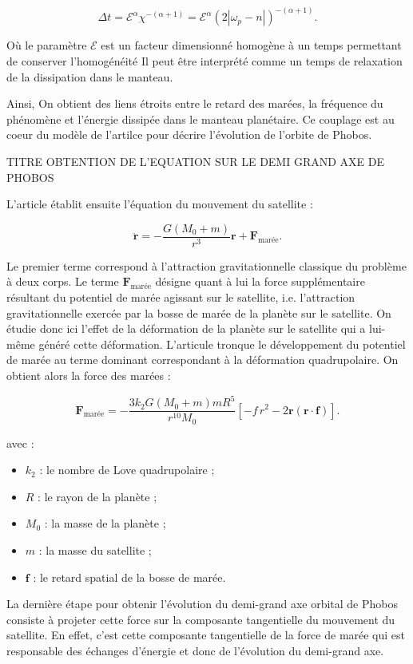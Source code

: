 \documentclass[12pt,a4paper]{article}
\begin{document}
\[
\Delta t = \mathcal{E}^\alpha \chi^{-(\alpha+1)}
=
\mathcal{E}^\alpha \left(2|\omega_p-n|\right)^{-(\alpha+1)}.
\]

Où le paramètre $\mathcal{E}$ est un facteur dimensionné homogène à un temps permettant de conserver l'homogénéité Il peut être interprété comme un temps de relaxation de la dissipation dans le manteau. 

Ainsi, On obtient des liens étroits entre le retard des marées, la fréquence du phénomène et l’énergie dissipée dans le manteau planétaire. Ce couplage  est au coeur du modèle de l'artilce pour décrire l'évolution de l'orbite de Phobos. 

    
TITRE OBTENTION DE L'EQUATION SUR LE DEMI GRAND AXE DE PHOBOS

L’article établit ensuite l’équation du mouvement du satellite :

\[
\ddot{\mathbf r}
=
-\frac{G(M_0+m)}{r^3}\mathbf r
+
\mathbf F_{\text{marée}}.
\]

Le premier terme correspond à l’attraction gravitationnelle classique du problème à deux corps. Le terme $\mathbf F_{\text{marée}}$ désigne quant à lui la force supplémentaire résultant du potentiel de marée agissant sur le satellite, i.e. l’attraction gravitationnelle exercée par la bosse de marée de la planète sur le satellite. On étudie donc ici l’effet de la déformation de la planète sur le satellite qui a lui-même généré cette déformation. L'articule tronque le développement du potentiel de marée au terme dominant correspondant à la déformation quadrupolaire. On obtient alors la force des marées :

\[
\mathbf F_{\text{marée}}
=
-\frac{3k_2G(M_0+m)mR^5}{r^{10}M_0}
\left[
\mathbf -f\,r^2
-
2\mathbf r(\mathbf r\cdot\mathbf f)
\right].
\]

avec :
\begin{itemize}
    \item $k_2$ : le nombre de Love quadrupolaire ;
    \item $R$ : le rayon de la planète ;
    \item $M_0$ : la masse de la planète ;
    \item $m$ : la masse du satellite ;
    \item $\mathbf f$ : le retard spatial de la bosse de marée.
\end{itemize}


    La dernière étape pour obtenir l’évolution du demi-grand axe orbital de Phobos consiste à projeter cette force sur la composante tangentielle du mouvement du satellite. En effet, c’est cette composante tangentielle de la force de marée qui est responsable des échanges d’énergie et donc de l’évolution du demi-grand axe. 
\end{document}
